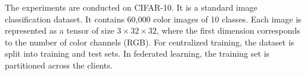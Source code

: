 \documentclass{article}
\begin{document}

The experiments are conducted on CIFAR-10. It is a standard image classification dataset. It contains 60{,}000 color images of 10 classes. Each image is represented as a tensor of size $3 \times 32 \times 32$, where the first dimension corresponds to the number of color channels (RGB). For centralized training, the dataset is split into training and test sets. In federated learning, the training set is partitioned across the clients.
\end{document}
